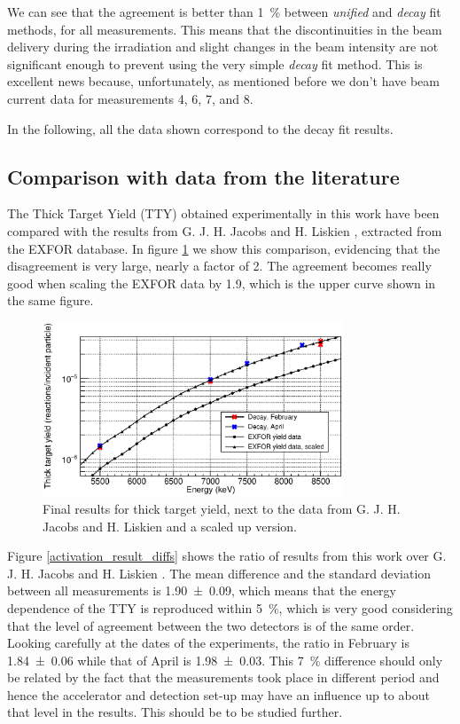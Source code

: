 \documentclass[a4paper,12pt]{report}
\begin{document}
We can see that the agreement is better than \qty{1}{\percent} between \textit{unified} and \textit{decay} fit methods, for all measurements.
This means that the discontinuities in the beam delivery during the irradiation and slight changes in the beam intensity are not significant enough to prevent using the very simple \textit{decay} fit method.
This is excellent news because, unfortunately, as mentioned before we don't have beam current data for measurements 4, 6, 7, and 8.

In the following, all the data shown correspond to the decay fit results.
\\

\subsection{Comparison with data from the literature}
The Thick Target Yield (TTY) obtained experimentally in this work have been compared with the results from G. J. H. Jacobs and H. Liskien \cite{jacobs}, extracted from the EXFOR database.
In figure \ref{activation_final_results} we show this comparison, evidencing that the disagreement is very large, nearly a factor of \num{2}.
The agreement becomes really good when scaling the EXFOR data by 1.9, which is the upper curve shown in the same figure.

\begin{figure}[H]
	\centering
	\includegraphics[width=0.80\textwidth]{activation_final_results.eps}	%
	\caption{Final results for thick target yield, next to the data from G. J. H. Jacobs and H. Liskien \cite{jacobs} and a scaled up version.}	%
	\label{activation_final_results}
\end{figure}

Figure \ref{activation_result_diffs} shows the ratio of results from this work over G. J. H. Jacobs and H. Liskien \cite{jacobs}.
The mean difference and the standard deviation between all measurements is \num{1.90(9)}, which means that the energy dependence of the TTY is reproduced within \qty{5}{\percent}, which is very good considering that the level of agreement between the two detectors is of the same order.
Looking carefully at the dates of the experiments, the ratio in February is \num{1.84(6)} while that of April is \num{1.98(3)}.
This \qty{7}{\percent} difference should only be related by the fact that the measurements took place in different period and hence the accelerator and detection set-up may have an influence up to about that level in the results.
This should be to be studied further.
\end{document}
